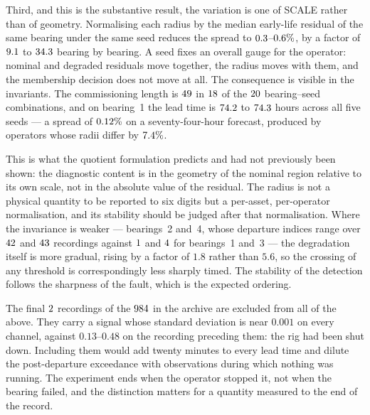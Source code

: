 \documentclass[a4paper]{cas-sc}
\begin{document}
Third, and this is the substantive result, the variation is one of SCALE
rather than of geometry. Normalising each radius by the median early-life
residual of the same bearing under the same seed reduces the spread to
\(0.3\)--\(0.6\%\), by a factor of \(9.1\) to \(34.3\) bearing by bearing. A seed fixes an overall gauge
for the operator: nominal and degraded residuals move together, the radius
moves with them, and the membership decision does not move at all. The
consequence is visible in the invariants. The commissioning length is \(49\)
in \(18\) of the \(20\) bearing--seed combinations, and on bearing~1 the lead
time is \(74.2\) to \(74.3\) hours across all five seeds --- a spread of
\(0.12\%\) on a seventy-four-hour forecast, produced by operators whose radii
differ by \(7.4\%\).

This is what the quotient formulation predicts and had not previously been
shown: the diagnostic content is in the geometry of the nominal region
relative to its own scale, not in the absolute value of the residual. The
radius is not a physical quantity to be reported to six digits but a
per-asset, per-operator normalisation, and its stability should be judged
after that normalisation. Where the invariance is weaker --- bearings~2 and~4,
whose departure indices range over \(42\) and \(43\) recordings against \(1\)
and \(4\) for bearings~1 and~3 --- the degradation itself is more gradual,
rising by a factor of \(1.8\) rather than \(5.6\), so the crossing of any
threshold is correspondingly less sharply timed. The stability of the
detection follows the sharpness of the fault, which is the expected ordering.

The final \(2\) recordings of the \(984\) in the
archive are excluded from all of the above. They carry a signal whose standard
deviation is near \(0.001\) on every channel, against \(0.13\)--\(0.48\)
on the recording preceding them: the rig had been shut down. Including them
would add twenty minutes to every lead time and dilute the post-departure
exceedance with observations during which nothing was running. The experiment
ends when the operator stopped it, not when the bearing failed, and the
distinction matters for a quantity measured to the end of the record.
\end{document}
